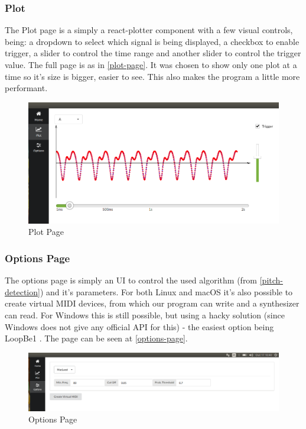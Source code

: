 \subsubsection{Plot}
The Plot page is a simply a react-plotter \cite{react-plotter} component with a few
visual controls, being: a dropdown to select which signal is being displayed,
a checkbox to enable trigger, a slider to control the time
range and another slider to control the trigger value. The full page is as in \autoref{plot-page}.
It was chosen to show only one plot at a time so it's size is bigger, easier to see.
This also makes the program a little more performant.
\begin{figure}[htb]
	\caption{Plot Page}
  \label{plot-page}
	\begin{center}
    \includegraphics[width=0.7\paperwidth]{images/snapshots/plot-trigger-A.png}
	\end{center}
\end{figure}

\subsubsection{Options Page}
The options page is simply an UI to control the used algorithm (from \autoref{pitch-detection})
and it's parameters. For both Linux and macOS it's also possible to create virtual
MIDI devices, from which our program can write and a synthesizer can read. For Windows
this is still possible, but using a hacky solution (since Windows does not give any
official API for this) - the easiest option being LoopBe1 \cite{LoopBe1}. The
page can be seen at \autoref{options-page}.
\begin{figure}[htb]
	\caption{Options Page}
	\label{options-page}
	\begin{center}
		\includegraphics[width=0.7\paperwidth]{images/snapshots/options.png}
	\end{center}
\end{figure}

